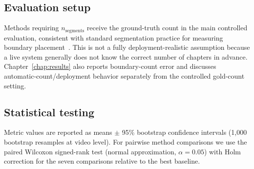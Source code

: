 \subsection{Evaluation setup}

Methods requiring $n_{\text{segments}}$ receive the ground-truth count in the
main controlled evaluation, consistent with standard segmentation practice
for measuring boundary placement~\cite{choi2000latent}. This is not a fully
deployment-realistic assumption because a live system generally does not know
the correct number of chapters in advance. Chapter~\ref{chap:results}
also reports boundary-count error and discusses automatic-count/deployment
behavior separately from the controlled gold-count setting.

\subsection{Statistical testing}

Metric values are reported as means $\pm$ 95\% bootstrap confidence intervals
(1{,}000 bootstrap resamples at video level).
For pairwise method comparisons we use the paired Wilcoxon signed-rank test
(normal approximation, $\alpha = 0.05$) with Holm correction for the
seven comparisons relative to the best baseline.

